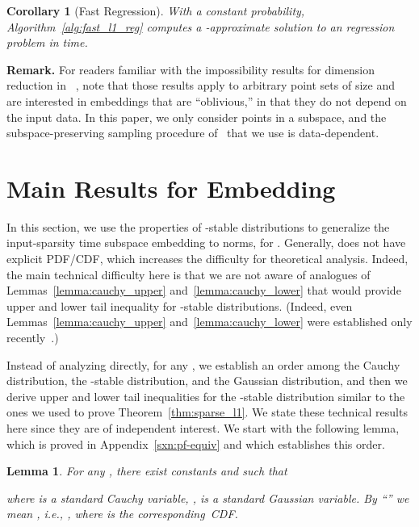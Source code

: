 \documentclass[11pt]{article}
\newtheorem{corollary}{Corollary}
\newtheorem{lemma}{Lemma}
\begin{document}
\begin{corollary}[Fast  Regression]
  \label{cor:l1reg}
  With a constant probability, Algorithm~\ref{alg:fast_l1_reg} computes a
  -approximate solution to an  regression problem in
   time.
\end{corollary}

\noindent
\textbf{Remark.}
For readers familiar with the impossibility results for dimension reduction in
~\cite{CS02,LN04,BC05}, note that those results apply to arbitrary point
sets of size  and are interested in embeddings that are ``oblivious,'' in
that they do not depend on the input data.
In this paper, we only consider points in a subspace, and the
subspace-preserving sampling procedure of~\cite{DDHKM09_lp_SICOMP} that we use
is data-dependent.  



\section{Main Results for  Embedding}
\label{sxn:lp} 

In this section, we use the properties of -stable distributions to generalize
the input-sparsity time  subspace embedding to  norms, for . 
Generally,  does not have explicit PDF/CDF, which increases the difficulty
for theoretical analysis. 
Indeed, the main technical difficulty here is that we are not aware of 
analogues of Lemmas~\ref{lemma:cauchy_upper} and~\ref{lemma:cauchy_lower} that
would provide upper and lower tail inequality for -stable distributions.
(Indeed, even Lemmas~\ref{lemma:cauchy_upper} and~\ref{lemma:cauchy_lower} were
established only recently~\cite{CDMMMW13_SODA}.)

Instead of analyzing  directly, for any , we
establish an order among the Cauchy distribution, the -stable distribution,
and the Gaussian distribution, and then we derive upper and lower tail
inequalities for the -stable distribution similar to the ones we used to
prove Theorem~\ref{thm:sparse_l1}.
We state these technical results here since they are of independent interest.
We start with the following lemma, which is proved in
Appendix~\ref{sxn:pf-equiv} and which establishes this order.

\begin{lemma}
  \label{lemma:equiv}
  For any , there exist constants  and 
  such that
  
  where  is a standard Cauchy variable, ,  is a standard
  Gaussian variable.
  By ``'' we mean , i.e., , where  is the
  corresponding~CDF.
\end{lemma}
\end{document}
